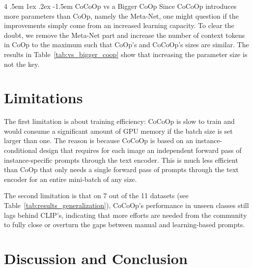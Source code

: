 \documentclass[10pt,twocolumn,letterpaper]{article}
\makeatletter
\renewcommand\paragraph{
  \@startsection{paragraph} {4} {\z@} {.5em \@plus1ex \@minus.2ex} {-1.5em} {\normalfont\normalsize\bfseries} }
\makeatother
\begin{document}
\paragraph{CoCoOp vs a Bigger CoOp}
Since CoCoOp introduces more parameters than CoOp, namely the Meta-Net, one might question if the improvements simply come from an increased learning capacity. To clear the doubt, we remove the Meta-Net part and increase the number of context tokens in CoOp to the maximum such that CoOp's and CoCoOp's sizes are similar. The results in Table~\ref{tab:vs_bigger_coop} show that increasing the parameter size is not the key.

\section{Limitations}
\label{sec:limitations}

The first limitation is about training efficiency: CoCoOp is slow to train and would consume a significant amount of GPU memory if the batch size is set larger than one. The reason is because CoCoOp is based on an instance-conditional design that requires for each image an independent forward pass of instance-specific prompts through the text encoder. This is much less efficient than CoOp that only needs a single forward pass of prompts through the text encoder for an entire mini-batch of any size.

The second limitation is that on 7 out of the 11 datasets (see Table~\ref{tab:results_generalization}), CoCoOp's performance in unseen classes still lags behind CLIP's, indicating that more efforts are needed from the community to fully close or overturn the gaps between manual and learning-based prompts.



\section{Discussion and Conclusion}
\label{sec:conclusion}
\end{document}
